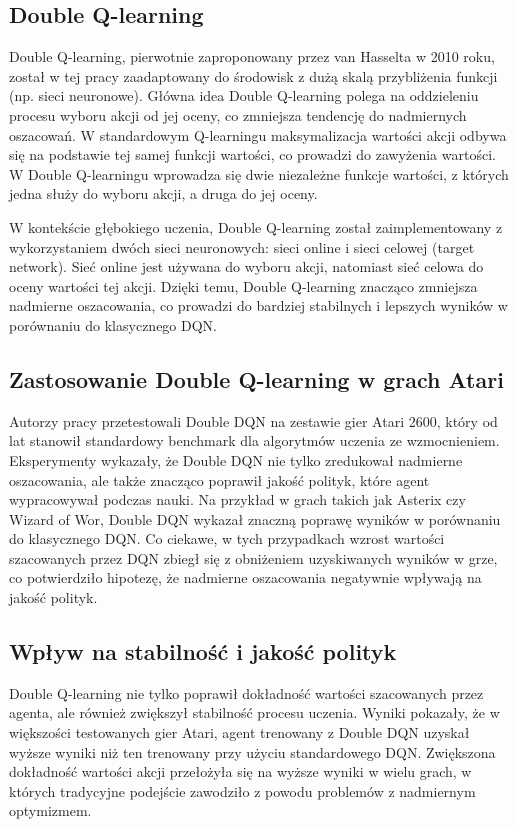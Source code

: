 \subsection{Double Q-learning}
Double Q-learning, pierwotnie zaproponowany przez van Hasselta w 2010 roku, został w tej pracy zaadaptowany do środowisk z dużą skalą przybliżenia funkcji (np. sieci neuronowe). Główna idea Double Q-learning polega na oddzieleniu procesu wyboru akcji od jej oceny, co zmniejsza tendencję do nadmiernych oszacowań. W standardowym Q-learningu maksymalizacja wartości akcji odbywa się na podstawie tej samej funkcji wartości, co prowadzi do zawyżenia wartości. W Double Q-learningu wprowadza się dwie niezależne funkcje wartości, z których jedna służy do wyboru akcji, a druga do jej oceny.

W kontekście głębokiego uczenia, Double Q-learning został zaimplementowany z wykorzystaniem dwóch sieci neuronowych: sieci online i sieci celowej (target network). Sieć online jest używana do wyboru akcji, natomiast sieć celowa do oceny wartości tej akcji. Dzięki temu, Double Q-learning znacząco zmniejsza nadmierne oszacowania, co prowadzi do bardziej stabilnych i lepszych wyników w porównaniu do klasycznego DQN.

\subsection{Zastosowanie Double Q-learning w grach Atari}
Autorzy pracy przetestowali Double DQN na zestawie gier Atari 2600, który od lat stanowił standardowy benchmark dla algorytmów uczenia ze wzmocnieniem. Eksperymenty wykazały, że Double DQN nie tylko zredukował nadmierne oszacowania, ale także znacząco poprawił jakość polityk, które agent wypracowywał podczas nauki. Na przykład w grach takich jak Asterix czy Wizard of Wor, Double DQN wykazał znaczną poprawę wyników w porównaniu do klasycznego DQN. Co ciekawe, w tych przypadkach wzrost wartości szacowanych przez DQN zbiegł się z obniżeniem uzyskiwanych wyników w grze, co potwierdziło hipotezę, że nadmierne oszacowania negatywnie wpływają na jakość polityk.

\subsection{Wpływ na stabilność i jakość polityk}
Double Q-learning nie tylko poprawił dokładność wartości szacowanych przez agenta, ale również zwiększył stabilność procesu uczenia. Wyniki pokazały, że w większości testowanych gier Atari, agent trenowany z Double DQN uzyskał wyższe wyniki niż ten trenowany przy użyciu standardowego DQN. Zwiększona dokładność wartości akcji przełożyła się na wyższe wyniki w wielu grach, w których tradycyjne podejście zawodziło z powodu problemów z nadmiernym optymizmem.

